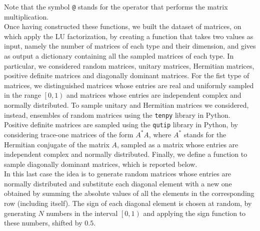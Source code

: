 \documentclass[a4paper,11pt]{report}
\begin{document}
\noindent Note that the symbol \texttt{@} stands for the operator that performs the matrix multiplication.\\

\noindent Once having constructed these functions, we built the dataset of matrices, on which apply the LU factorization, by creating a function that takes two values as input, namely the number of matrices of each type and their dimension, and gives as output a dictionary containing all the sampled matrices of each type. In particular, we considered random matrices, unitary matrices, Hermitian matrices, positive definite matrices and diagonally dominant matrices. For the fist type of matrices, we distinguished matrices whose entries are real and uniformly sampled in the range $\left[0,1\right)$ and matrices whose entries are independent complex and normally distributed. To sample unitary and Hermitian matrices we considered, instead, ensembles of random matrices using the \texttt{tenpy} library in Python. Positive definite matrices are sampled using the \texttt{qutip} library in Python, by considering trace-one matrices of the form $A^{*}A$, where $A^{*}$ stands for the Hermitian conjugate of the matrix $A$, sampled as a matrix whose entries are independent complex and normally distributed. Finally, we define a function to sample diagonally dominant matrices, which is reported below.\\

\noindent In this last case the idea is to generate random matrices whose entries are normally distributed and substitute each diagonal element with a new one obtained by summing the absolute values of all the elements in the corresponding row (including itself). The sign of each diagonal element is chosen at random, by generating $N$ numbers in the interval $\left[0,1\right)$ and applying the sign function to these numbers, shifted by $0.5$.
\end{document}
